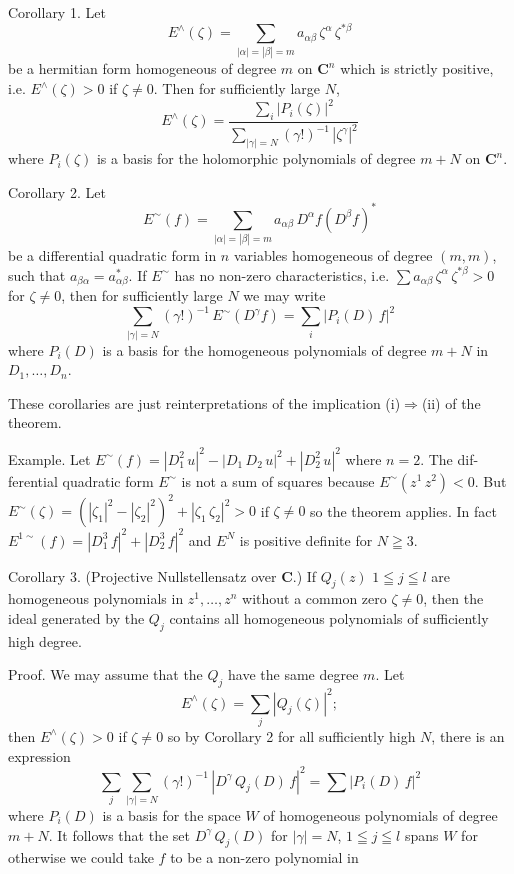 
Corollary 1. Let
\[ E^{\wedge}(\zeta)=\sum_{|\alpha|=|\beta|=m} a_{\alpha\beta}\,\zeta^{\alpha}\,\zeta^{*\beta} \]
be a hermitian form homogeneous of degree $m$ on $\mathbf{C}^n$ which is strictly
positive, i.e. $E^{\wedge}(\zeta)>0$ if $\zeta\neq 0$. Then for sufficiently large $N$,
\[ E^{\wedge}(\zeta)=\frac{\sum\limits_{i}|P_i(\zeta)|^2}{\sum\limits_{|\gamma|=N}(\gamma!)^{-1}\,|\zeta^{\gamma}|^2} \]
where $P_i(\zeta)$ is a basis for the holomorphic polynomials of degree $m+N$ on $\mathbf{C}^n$.

Corollary 2. Let
\[ E^{\sim}(f)=\sum_{|\alpha|=|\beta|=m} a_{\alpha\beta}\,D^{\alpha}f(D^{\beta}f)^* \]
be a differential quadratic form in $n$ variables homogeneous of degree
$(m,m)$, such that $a_{\beta\alpha}=a^*_{\alpha\beta}$. If $E^{\sim}$ has no non-zero characteristics, i.e.
$\sum a_{\alpha\beta}\,\zeta^{\alpha}\,\zeta^{*\beta}>0$ for $\zeta\neq 0$, then for sufficiently large $N$ we may write
\[ \sum_{|\gamma|=N}(\gamma!)^{-1}\,E^{\sim}(D^{\gamma}f)=\sum_{i}|P_i(D)\,f|^2 \]
where $P_i(D)$ is a basis for the homogeneous polynomials of degree $m+N$
in $D_1,\dots,D_n$.

These corollaries are just reinterpretations of the implication (i)$\Rightarrow$(ii)
of the theorem.

Example. Let $E^{\sim}(f)=|D_1^2\,u|^2-|D_1\,D_2\,u|^2+|D_2^2\,u|^2$ where $n=2$. The dif-%
ferential quadratic form $E^{\sim}$ is not a sum of squares because $E^{\sim}(z^1\,z^2)<0$.
But $E^{\sim}(\zeta)=(|\zeta_1|^2-|\zeta_2|^2)^2+|\zeta_1\,\zeta_2|^2>0$ if $\zeta\neq 0$ so the theorem applies.
In fact $E^{1\sim}(f)=|D_1^3\,f|^2+|D_2^3\,f|^2$ and $E^N$ is positive definite for $N\geqq 3$.

Corollary 3. (Projective Nullstellensatz over $\mathbf{C}$.) If $Q_j(z)$ $1\leqq j\leqq l$ are
homogeneous polynomials in $z^1,\dots,z^n$ without a common zero $\zeta\neq 0$, then
the ideal generated by the $Q_j$ contains all homogeneous polynomials of
sufficiently high degree.

Proof. We may assume that the $Q_j$ have the same degree $m$. Let
\[ E^{\wedge}(\zeta)=\sum_{j}|Q_j(\zeta)|^2; \]
then $E^{\wedge}(\zeta)>0$ if $\zeta\neq 0$ so by Corollary 2 for all sufficiently high $N$, there
is an expression
\[ \sum_{j}\sum_{|\gamma|=N}(\gamma!)^{-1}\,|D^{\gamma}\,Q_j(D)\,f|^2=\sum|P_i(D)\,f|^2 \]
where $P_i(D)$ is a basis for the space $W$ of homogeneous polynomials
of degree $m+N$. It follows that the set $D^{\gamma}\,Q_j(D)$ for $|\gamma|=N$, $1\leqq j\leqq l$
spans $W$ for otherwise we could take $f$ to be a non-zero polynomial in

